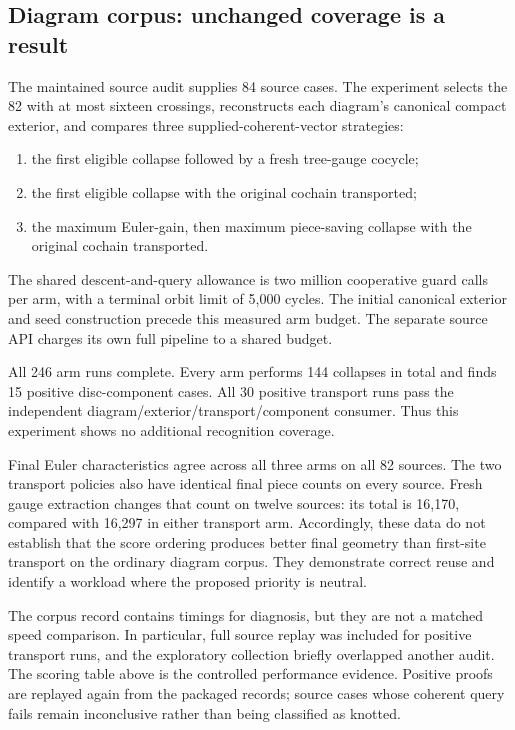 \subsection{Diagram corpus: unchanged coverage is a result}

The maintained source audit supplies 84 source cases. The experiment
selects the 82 with at most sixteen crossings, reconstructs each diagram's
canonical compact exterior, and compares three supplied-coherent-vector
strategies:
\begin{enumerate}
\item the first eligible collapse followed by a fresh tree-gauge cocycle;
\item the first eligible collapse with the original cochain transported;
\item the maximum Euler-gain, then maximum piece-saving collapse with
the original cochain transported.
\end{enumerate}
The shared descent-and-query allowance is two million cooperative guard
calls per arm, with a terminal orbit limit of 5,000 cycles. The initial
canonical exterior and seed construction precede this measured arm budget.
The separate source API charges its own full pipeline to a shared budget.

All 246 arm runs complete. Every arm performs 144 collapses in total and
finds 15 positive disc-component cases. All 30 positive transport runs
pass the independent diagram/exterior/transport/component consumer.
Thus this experiment shows no additional recognition coverage.

Final Euler characteristics agree across all three arms on all 82 sources.
The two transport policies also have identical final piece counts on every
source. Fresh gauge extraction changes that count on twelve sources:
its total is 16,170, compared with 16,297 in either transport arm.
Accordingly, these data do not establish that the score ordering produces
better final geometry than first-site transport on the ordinary diagram
corpus. They demonstrate correct reuse and identify a workload where the
proposed priority is neutral.

The corpus record contains timings for diagnosis, but they are not a
matched speed comparison. In particular, full source replay was included
for positive transport runs, and the exploratory collection briefly
overlapped another audit. The scoring table above is the controlled
performance evidence. Positive proofs are replayed again from the
packaged records; source cases whose coherent query fails remain
inconclusive rather than being classified as knotted.

